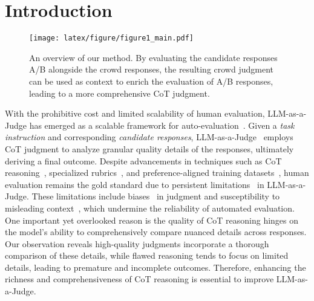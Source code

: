\section{Introduction}
\label{sec:intro}

\begin{figure}[!t]
  \centering
  \texttt{[image: latex/figure/figure1\_main.pdf]}
  \caption {An overview of our method. By evaluating the candidate responses A/B alongside the crowd responses, the resulting crowd judgment can be used as context to enrich the evaluation of A/B responses, leading to a more comprehensive CoT judgment.}
  \label{fig:overview}
\end{figure}

With the prohibitive cost and limited scalability of human evaluation, LLM-as-a-Judge has emerged as a scalable framework for auto-evaluation~\citep{chang2024survey,li2024llmsas,li2025generationjudgmentopportunitieschallenges}.
Given a \textit{task instruction} and corresponding \textit{candidate responses}, LLM-as-a-Judge~\citep{zheng2023mtbench,wang2024selftaughtevaluators,wagner2024blackbox} employs CoT judgment to analyze granular quality details of the responses, ultimately deriving a final outcome.
Despite advancements in techniques such as CoT reasoning~\citep{saha2025learningplanreason,zheng2023mtbench}, specialized rubrics~\citep{liu2023geval}, and preference-aligned training datasets~\citep{li2024generative,wang2024pandalm}, human evaluation remains the gold standard due to persistent limitations~\citep{zeng2024evaluating} in LLM-as-a-Judge.
These limitations include biases~\citep{park2024offsetbias} in judgment and susceptibility to misleading context~\citep{dubois2024lengthcontrolledalpacaevalsimpleway,chen2024humans}, which undermine the reliability of automated evaluation.
One important yet overlooked reason is the quality of CoT reasoning hinges on the model’s ability to comprehensively compare nuanced details across responses. Our observation reveals high-quality judgments incorporate a thorough comparison of these details, while flawed reasoning tends to focus on limited details, leading to premature and incomplete outcomes. Therefore, enhancing the richness and comprehensiveness of CoT reasoning is essential to improve LLM-as-a-Judge.





